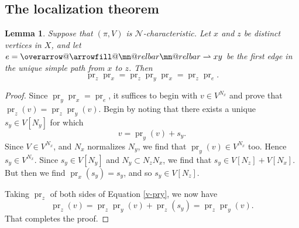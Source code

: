 \documentclass[letter]{amsart}
\makeatletter
\newtheorem{lemma}[thm]{Lemma}
\theoremstyle{definition}
\theoremstyle{remark}
\numberwithin{thm}{section}
\numberwithin{equation}{section}
\DeclareRobustCommand{\overrightharpoon}{\mathpalette{\overarrow@\rightharpoonfill@}}
\def\rightharpoonfill@{\arrowfill@\mn@relbar\mn@relbar\rightharpoonup}
\newcommand{\edge}[1]{\overrightharpoon{#1}}
\renewcommand{\NN}{{\mathcal N}}
\DeclareMathOperator{\pr}{pr}
\makeatother
\begin{document}
\subsection{The localization theorem}


\begin{lemma}
\label{xez-lem}
Suppose that $(\pi, V)$ is $\NN$-characteristic.  Let $x$ and $z$ be distinct vertices in $X$, and let $e = \edge{xy}$ be the first edge in the unique simple path from $x$ to $z$.  Then
$$\pr_z \pr_x = \pr_z \pr_y \pr_x = \pr_z \pr_e.$$
\end{lemma}
\begin{proof}
Since $\pr_y \pr_x = \pr_e$, it suffices to begin with $v \in V^{N_x}$ and prove that $\pr_z(v) = \pr_z \pr_y(v)$.  Begin by noting that there exists a unique $s_y \in V[N_y]$ for which
\begin{equation}
\label{v-pry}
v = \pr_y(v) + s_y.
\end{equation}
Since $V \in V^{N_x}$, and $N_x$ normalizes $N_y$, we find that $\pr_y(v) \in V^{N_x}$ too.  Hence $s_y \in V^{N_x}$.  Since $s_y \in V[N_y]$ and $N_y \subset N_z N_x$, we find that $s_y \in V[N_z] + V[N_x]$.  But then we find $\pr_x(s_y) = s_y$, and so $s_y \in V[N_z]$.  

Taking $\pr_z$ of both sides of Equation \ref{v-pry}, we now have
$$\pr_z(v) = \pr_z \pr_y(v) + \pr_z(s_y) = \pr_z \pr_y(v).$$
That completes the proof.
\end{proof}
\end{document}
